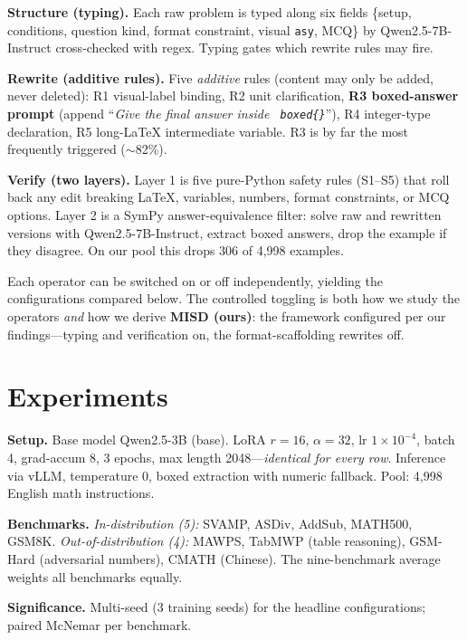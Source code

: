 \documentclass[letterpaper]{article} %
\begin{document}
\noindent\textbf{Structure (typing).} Each raw problem is typed along six fields \{setup, conditions, question kind, format constraint, visual \texttt{asy}, MCQ\} by Qwen2.5-7B-Instruct cross-checked with regex. Typing gates which rewrite rules may fire.

\noindent\textbf{Rewrite (additive rules).} Five \emph{additive} rules (content may only be added, never deleted): R1 visual-label binding, R2 unit clarification, \textbf{R3 boxed-answer prompt} (append ``\textit{Give the final answer inside \texttt{ boxed\{\}}}''), R4 integer-type declaration, R5 long-LaTeX intermediate variable. R3 is by far the most frequently triggered ($\sim$82\%).

\noindent\textbf{Verify (two layers).} Layer 1 is five pure-Python safety rules (S1--S5) that roll back any edit breaking LaTeX, variables, numbers, format constraints, or MCQ options. Layer 2 is a SymPy answer-equivalence filter: solve raw and rewritten versions with Qwen2.5-7B-Instruct, extract boxed answers, drop the example if they disagree. On our pool this drops 306 of 4{,}998 examples.

Each operator can be switched on or off independently, yielding the configurations compared below. The controlled toggling is both how we study the operators \emph{and} how we derive \textbf{MISD (ours)}: the framework configured per our findings---typing and verification on, the format-scaffolding rewrites off.

\section{Experiments}\label{sec:exp}

\noindent\textbf{Setup.} Base model Qwen2.5-3B (base). LoRA $r{=}16$, $\alpha{=}32$, lr $1\!\times\!10^{-4}$, batch 4, grad-accum 8, 3 epochs, max length 2048---\emph{identical for every row}. Inference via vLLM, temperature 0, boxed extraction with numeric fallback. Pool: 4{,}998 English math instructions.

\noindent\textbf{Benchmarks.} \emph{In-distribution (5):} SVAMP, ASDiv, AddSub, MATH500, GSM8K. \emph{Out-of-distribution (4):} MAWPS, TabMWP (table reasoning), GSM-Hard (adversarial numbers), CMATH (Chinese). The nine-benchmark average weights all benchmarks equally.

\noindent\textbf{Significance.} Multi-seed (3 training seeds) for the headline configurations; paired McNemar per benchmark.
\end{document}
